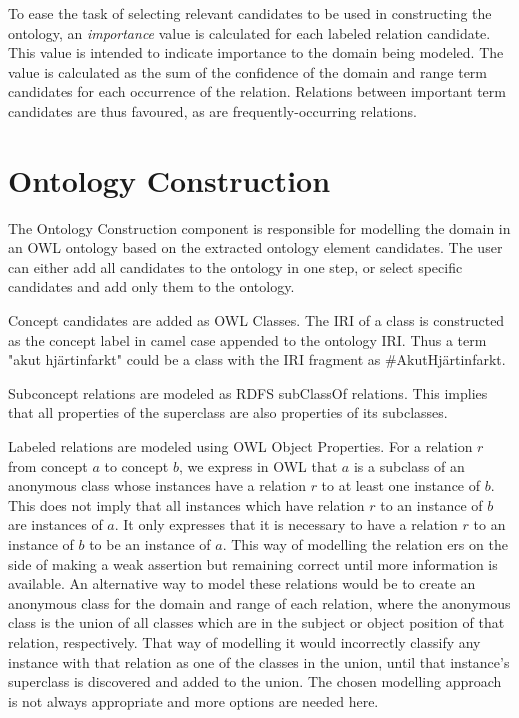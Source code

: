\documentclass[a4paper]{report}
\begin{document}
To ease the task of selecting relevant candidates to be used in constructing the ontology, an \emph{importance} value is calculated for each labeled relation candidate.
This value is intended to indicate importance to the domain being modeled.
The value is calculated as the sum of the confidence of the domain and range term candidates for each occurrence of the relation.
Relations between important term candidates are thus favoured, as are frequently-occurring relations.

\section{Ontology Construction}
\label{sec:results:proto:contruction}

The Ontology Construction component is responsible for modelling the domain in an OWL ontology based on the extracted ontology element candidates.
The user can either add all candidates to the ontology in one step, or select specific candidates and add only them to the ontology.

Concept candidates are added as OWL Classes.
The IRI of a class is constructed as the concept label in camel case appended to the ontology IRI.
Thus a term "akut hjärtinfarkt" could be a class with the IRI fragment as \#AkutHjärtinfarkt.

Subconcept relations are modeled as RDFS subClassOf relations.
This implies that all properties of the superclass are also properties of its subclasses.

Labeled relations are modeled using OWL Object Properties.
For a relation \(r\) from concept \(a\) to concept \(b\), we express in OWL that \(a\) is a subclass of an anonymous class whose instances have a relation \(r\) to at least one instance of \(b\).
This does not imply that all instances which have relation \(r\) to an instance of \(b\) are instances of \(a\).
It only expresses that it is necessary to have a relation \(r\) to an instance of \(b\) to be an instance of \(a\).
This way of modelling the relation ers on the side of making a weak assertion but remaining correct until more information is available.
An alternative way to model these relations would be to create an anonymous class for the domain and range of each relation, where the anonymous class is the union of all classes which are in the subject or object position of that relation, respectively.
That way of modelling it would incorrectly classify any instance with that relation as one of the classes in the union, until that instance's superclass is discovered and added to the union.
The chosen modelling approach is not always appropriate and more options are needed here.
\end{document}
